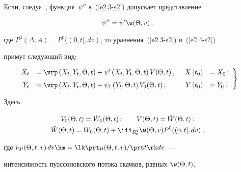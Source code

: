 Если, следуя~\cite{7-s2}, функция~$\psi''$ в~(\ref{e2.3-s2}) допускает представление

\begin{equation*}

\psi'' = \psi' \w (\Theta, v)\,,


\end{equation*}

где  $P^0 (\Delta, A) = P^0 ((0,t], dv)$, то уравнения~(\ref{e2.3-s2}) и~(\ref{e2.4-s2}) 

примут следующий вид:

    \begin{equation}

    \left.

    \begin{array}{rlrl}

    \dot X_t &=\vrp \left(X_t, Y_t, \Theta, t\right)+\psi' \left(X_t, Y_t, \Theta, t\right)

    V(\Theta, t)\,,&\enskip X\left(t_0\right)&=X_0\,;\\[6pt]

    \dot Y_t &= \vrp\left(X_t, Y_t, \Theta, t\right)+\psi_1 \left(Y_t, \Theta, t\right) 

    V_0 (\Theta, t)\,,&\enskip Y\left(t_0\right) &= Y_0\,. %

    \end{array}

    \right\}

    \label{e2.8-s2}

    \end{equation}

Здесь

\begin{gather*}

V_0 (\Theta, t) =\dot W_0 (\Theta, t)\,;\qquad V (\Theta, t)=\dot{\bar W}  (\Theta, t)\,;\\

    \bar W (\Theta, t) = W_0  (\Theta, t)+ \iii_{R_0^q} \w (\Theta, v) 

    P^0 ((0,t],dv)\,,


    \end{gather*}

где $\nu_P  (\Theta, t,v) \,dv\hm= \lk \prt \mu  (\Theta, t,v)/\prt t\rk dv$~--- 

интенсивность пуассоновского потока скачков, равных $\w (\Theta, t)$.

